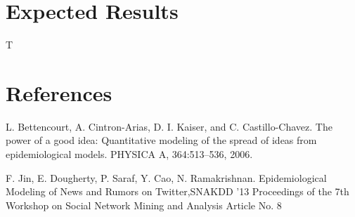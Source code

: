 \documentclass{article}
\begin{document}
\section{Expected Results}
T
\section{References}
\begin{enumerate}[label={[\arabic*]}]
\item  L. Bettencourt, A. Cintron-Arias, D. I. Kaiser, and C. Castillo-Chavez. The power of a good idea: Quantitative modeling of the spread of ideas from epidemiological models. PHYSICA A, 364:513–536, 2006.
\item F. Jin, E. Dougherty, P. Saraf, Y. Cao, N. Ramakrishnan. Epidemiological Modeling of News and Rumors on Twitter,SNAKDD '13 Proceedings of the 7th Workshop on Social Network Mining and Analysis
Article No. 8 
\item 
\end{enumerate}
\end{document}
